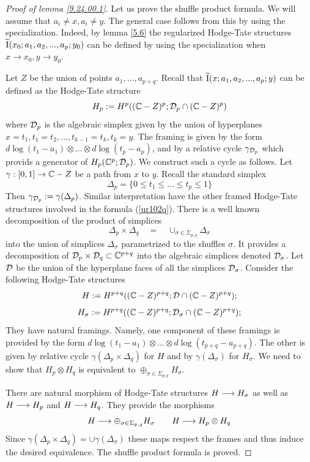 \documentclass[10pt]{article}
\begin{document}
\begin{proof}[Proof of lemma \ref{9.24.00.1}] Let us prove the shuffle product formula. 
We will assume that $a_i \not = x, a_i \not = y$. The general case follows 
from this by using the specialization. Indeed,  by lemma \ref{5.6} the regularized 
Hodge-Tate structures  $\widetilde {\rm I}(x_0; a_{1}, a_{2},  ...  , a_{p}; y_0)$
can be defined by using the specialization when $x \to x_0, y \to y_0$. 

Let $Z$ be the union of points $a_1, ..., a_{p+q}$. Recall that 
$\widetilde {\rm I}(x; a_{1}, a_{2},  ...  , a_{p}; y)$ can be defined as the 
Hodge-Tate structure 
$$
H_p:= H^p(({\mathbb C} - Z)^p; {\cal D}_p \cap ({\mathbb C} - Z)^p )
$$
where ${\cal D}_p$ is the algebraic simplex given by the union of hyperplanes 
$x =t_1, t_1 = t_2, ..., t_{k-1} = t_k, t_k = y$.  The framing is given by the form 
$d \log (t_1 - a_1) \otimes ... \otimes d \log (t_p - a_p)$, and by a relative cycle 
$\gamma_{{\cal D}_p}$ which provids a generator of $H_p({\mathbb C}^p; {\cal D}_p)$. 
We construct such a cycle as follows. Let $\gamma: [0,1] \to {\mathbb C} - Z$ 
be a path from $x$ to $y$. Recall the standard simplex 
$$
\Delta_p = \{0 \leq t_1 \leq ... \leq t_p \leq 1\} 
$$ 
Then $\gamma_{{\cal D}_p}:= \gamma(\Delta_p)$. 
Similar interpretation have the other framed Hodge-Tate structures involved in the formula 
(\ref{ur102q}). 
There is a well known  decomposition of the product of simplices
$$
\Delta_p \times \Delta_q \quad = \quad \cup_{\sigma \in \Sigma_{p,q}}\Delta_{\sigma}
$$ 
into the union of simplices $\Delta_{\sigma}$
parametrized to the shuffles $\sigma$. It provides 
a decomposition of ${\cal D}_p \times {\cal D}_q \subset {\mathbb C}^{p+q}$ into the  algebraic simplices denoted 
${\cal D}_{\sigma}$. Let 
$ {\cal D}$ be the union of the hyperplane faces of all the simplices ${\cal D}_{\sigma}$. 
Consider the following 
Hodge-Tate structures 
$$
H:= H^{p+q}(({\mathbb C} - Z)^{p+q};  {\cal D} \cap ({\mathbb C} - Z)^{p+q}); 
$$
$$
 H_{\sigma}:= H^{p+q}(({\mathbb C} - Z)^{p+q}; 
 {\cal D}_{\sigma} \cap ({\mathbb C} - Z)^{p+q} ); 
$$
They have  natural framings. Namely, one component of these framings
 is  provided by the form 
$d \log (t_1 - a_1) \otimes ... \otimes d \log (t_{p+q} - a_{p+q})$. 
The other is given by  
relative cycle $\gamma(\Delta_p \times \Delta_q)$ for $H$ and by 
$\gamma(\Delta_{\sigma})$ for $H_{\sigma}$.  We need to show that 
$H_p \otimes H_q$ is equivalent to $\oplus_{\sigma \in \Sigma_{p,q}} H_{\sigma}$. 

 There are natural morphism 
of Hodge-Tate structures $H \longrightarrow  H_{\sigma}$ as well as $H \longrightarrow  H_p$ and $H \longrightarrow  H_q$.  
They provide the morphisms
$$
H \longrightarrow \oplus_{\sigma \in \Sigma_{p,q}}  H_{\sigma}\qquad 
H \longrightarrow H_{p} \otimes H_{q}
$$
Since $\gamma(\Delta_{p} \times \Delta_{q}) = \cup \gamma(\Delta_{\sigma})$ these maps 
respect the frames and thus induce the desired equivalence. 
The shuffle product formula is proved. 


\end{proof}
\end{document}
